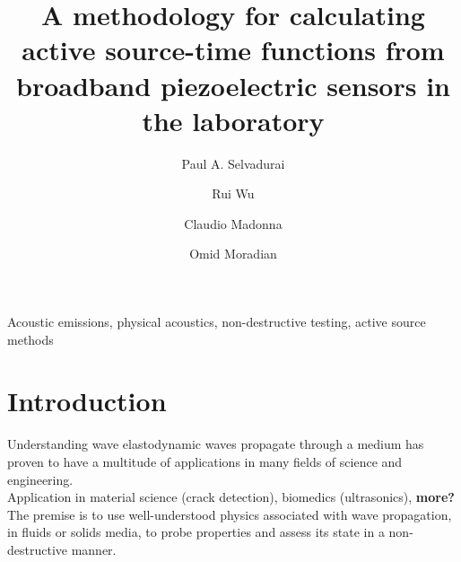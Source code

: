 \documentclass[preprint,3p, 11pt,authoryear]{elsarticle}
\begin{document}
\begin{frontmatter}



\title{A methodology for calculating active source-time functions from broadband piezoelectric sensors in the laboratory}

 \author[1]{Paul A. Selvadurai }
\author[2]{Rui Wu}
\author[3]{Claudio Madonna}
\author[2]{Omid Moradian}




\address[1]{Swiss Seismological Service, ETH Zurich, Zurich, Switzerland}
\address[2]{Engineering Geology Group, ETH Zurich, Zurich, Switzerland}
\address[3]{Department of Earth Sciences, ETH Zurich, Zurich, Switzerland}



\begin{abstract}

\end{abstract}

\begin{keyword}
Acoustic emissions, physical acoustics, non-destructive testing, active source methods
\end{keyword}
\end{frontmatter}

\doublespacing
\linenumbers
\clearpage
\section{Introduction}
\label{int}

Understanding wave elastodynamic waves propagate through a medium has proven to have a multitude of applications in many fields of science and engineering.  
\\

Application in material science (crack detection), biomedics (ultrasonics), \textbf{more?} 
\\
The premise is to use well-understood physics associated with wave propagation, in fluids or solids media, to probe properties and assess its state in a non-destructive manner. 

\\\
\end{document}
